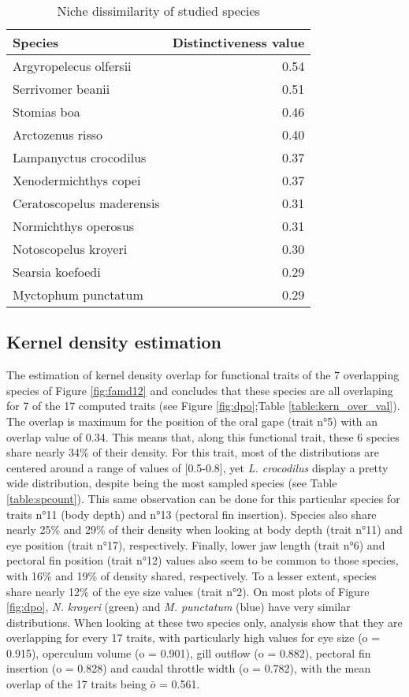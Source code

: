 \begin{table}[!htbp]
\centering
\caption{Niche dissimilarity of studied species}
\label{table:nich_diss}
\begin{adjustbox}{max width=1.1\textwidth,center}
\begin{tabular}{lr}
  \hline
Species & Distinctiveness value \\ 
  \hline
Argyropelecus olfersii & 0.54 \\ 
  Serrivomer beanii & 0.51 \\ 
  Stomias boa & 0.46 \\ 
  Arctozenus risso & 0.40 \\ 
  Lampanyctus crocodilus & 0.37 \\ 
  Xenodermichthys copei & 0.37 \\ 
  Ceratoscopelus maderensis & 0.31 \\ 
  Normichthys operosus & 0.31 \\ 
  Notoscopelus kroyeri & 0.30 \\ 
  Searsia koefoedi & 0.29 \\ 
  Myctophum punctatum & 0.29 \\  
   \hline
\end{tabular}
\end{adjustbox}
\end{table}


\subsection{Kernel density estimation}
The estimation of kernel density overlap for functional traits of the 7 overlapping species of Figure \ref{fig:famd12} and concludes that these species are all overlaping for 7 of the 17 computed traits (see Figure \ref{fig:dpo};Table \ref{table:kern_over_val}). The overlap is maximum for the position of the oral gape (trait n°5) with an overlap value of 0.34. This means that, along this functional trait, these 6 species share nearly 34\% of their density. For this trait, most of the distributions are centered around a range of values of [0.5-0.8], yet \textit{L. crocodilus} display a pretty wide distribution, despite being the most sampled species (see Table \ref{table:spcount}). This same observation can be done for this particular species for traits n°11 (body depth) and n°13 (pectoral fin insertion). Species also share nearly 25\% and 29\% of their density when looking at body depth (trait n°11) and eye position (trait n°17), respectively. Finally, lower jaw length (trait n°6) and pectoral fin position (trait n°12) values also seem to be common to those species, with 16\% and 19\% of density shared, respectively. To a lesser extent, species share nearly 12\% of the eye size values (trait n°2).
On most plots of Figure \ref{fig:dpo}, \textit{N. kroyeri} (green) and \textit{M. punctatum} (blue) have very similar distributions. When looking at these two species only, analysis show that they are overlapping for every 17 traits, with particularly high values for eye size (o = 0.915), operculum volume (o = 0.901), gill outflow (o = 0.882), pectoral fin insertion (o = 0.828) and caudal throttle width (o = 0.782), with the mean overlap of the 17 traits being $\bar{o}$ = 0.561.


